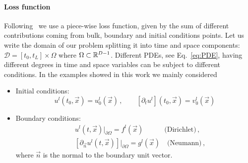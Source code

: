\documentclass{article}
\begin{document}
\paragraph{Loss function}
Following~\cite{Sirignano_2018} we use a piece-wise loss function, given by the sum of different contributions coming from bulk, boundary and initial conditions points. Let us write the domain of our problem splitting it into time and space components: $\mathcal{D}=[t_0,t_L]\times \Omega$ where $\Omega\subset \Bbb R^{D-1}$. Different PDEs, see Eq.~\eqref{eq:PDE}, having different degrees in time and space variables can be subject to different conditions. In the examples showed in this work we mainly considered

\begin{itemize}
\item Initial conditions:
\begin{equation}
u^l(t_0,\vec{x})=u_0^l(\vec{x}) \,, \qquad [\partial_t u^l](t_0,\vec{x})=v_0^l(\vec{x})
\end{equation}
\item Boundary conditions:
\begin{eqnarray}
&& u^l(t,\vec{x})|_{\partial\Omega}=f^l(\vec{x}) \qquad \quad  \text{(Dirichlet)} \,, \\
&& \left[\partial_{\vec{n}} u^l (t,\vec{x})\right]|_{\partial\Omega}=g^l(\vec{x}) \quad \text{(Neumann)} \,,
\end{eqnarray}
where $\vec{n}$ is the normal to the boundary unit vector.
\end{itemize}
\end{document}
